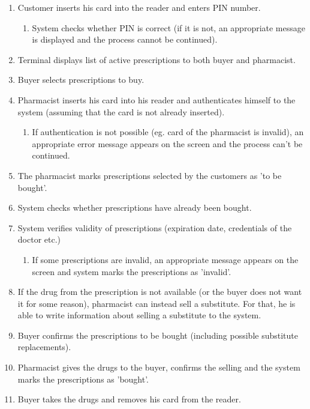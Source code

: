 \begin{enumerate}
  \item Customer inserts his card into the reader and enters PIN number.
  \begin{enumerate}
	\item System checks whether PIN is correct (if it is not, an appropriate message is displayed and the process cannot be continued).
  \end{enumerate}
  \item Terminal displays list of active prescriptions to both buyer and pharmacist.
  \item Buyer selects prescriptions to buy.
  \item Pharmacist inserts his card into his reader and authenticates himself to the system (assuming that the card is not already inserted).
  \begin{enumerate}
	\item  If authentication is not possible (eg. card of the pharmacist is invalid), an appropriate error message appears on the screen and the process can't be continued.
  \end{enumerate}
  \item The pharmacist marks prescriptions selected by the customers as 'to be bought'.
  \item System checks whether prescriptions have already been bought.
  \item System verifies validity of prescriptions (expiration date, credentials of the doctor etc.)
 \begin{enumerate}
	\item If some prescriptions are invalid, an appropriate message appears on the screen and system marks the prescriptions as 'invalid'.
  \end{enumerate}
  \item  If the drug from the prescription is not available (or the buyer does not want it for some reason), pharmacist can instead sell a substitute. For that, he is able to write information about selling a substitute to the system.
  \item Buyer confirms the prescriptions to be bought (including possible substitute replacements).
  \item Pharmacist gives the drugs to the buyer, confirms the selling and the system marks the prescriptions as 'bought'.
  \item  Buyer takes the drugs and removes his card from the reader.
\end{enumerate}

